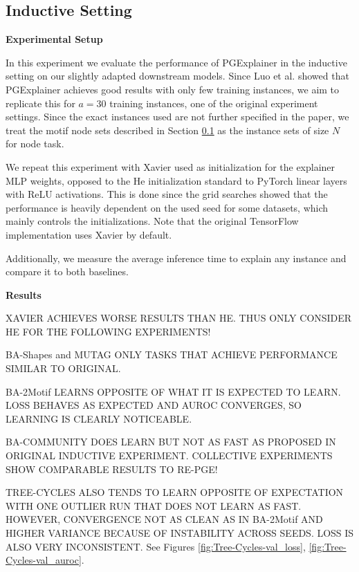 \subsection{Inductive Setting}

\textbf{Experimental Setup} \par
In this experiment we evaluate the performance of PGExplainer in the inductive setting on our slightly adapted downstream models. Since Luo et al. \cite{luo2020parameterized} showed that PGExplainer achieves good results with only few training instances, we aim to replicate this for $a=30$ training instances, one of the original experiment settings. Since the exact instances used are not further specified in the paper, we treat the motif node sets described in Section \ref{} as the instance sets of size $N$ for node task.

We repeat this experiment with Xavier \cite{glorot2010understanding} used as initialization for the explainer MLP weights, opposed to the He \cite{he2015delving} initialization standard to PyTorch linear layers with ReLU activations. This is done since the grid searches showed that the performance is heavily dependent on the used seed for some datasets, which mainly controls the initializations. Note that the original TensorFlow \cite{tensorflow2015-whitepaper} implementation uses Xavier by default. 

Additionally, we measure the average inference time to explain any instance and compare it to both baselines. \bigskip


\textbf{Results}

XAVIER ACHIEVES WORSE RESULTS THAN HE. THUS ONLY CONSIDER HE FOR THE FOLLOWING EXPERIMENTS!

BA-Shapes and MUTAG ONLY TASKS THAT ACHIEVE PERFORMANCE SIMILAR TO ORIGINAL. 

BA-2Motif LEARNS OPPOSITE OF WHAT IT IS EXPECTED TO LEARN. LOSS BEHAVES AS EXPECTED AND AUROC CONVERGES, SO LEARNING IS CLEARLY NOTICEABLE.

BA-COMMUNITY DOES LEARN BUT NOT AS FAST AS PROPOSED IN ORIGINAL INDUCTIVE EXPERIMENT. COLLECTIVE EXPERIMENTS SHOW COMPARABLE RESULTS TO RE-PGE!

TREE-CYCLES ALSO TENDS TO LEARN OPPOSITE OF EXPECTATION WITH ONE OUTLIER RUN THAT DOES NOT LEARN AS FAST. HOWEVER, CONVERGENCE NOT AS CLEAN AS IN BA-2Motif AND HIGHER VARIANCE BECAUSE OF INSTABILITY ACROSS SEEDS. LOSS IS ALSO VERY INCONSISTENT. See Figures \ref{fig:Tree-Cycles-val_loss}, \ref{fig:Tree-Cycles-val_auroc}.

